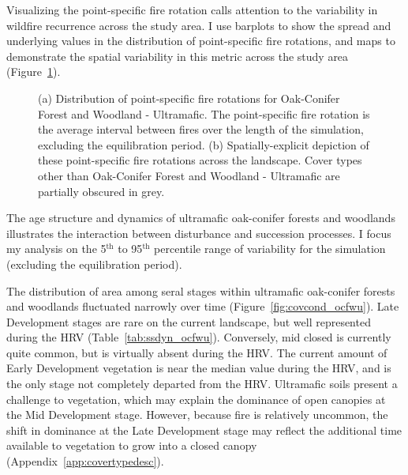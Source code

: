 Visualizing the point-specific fire rotation calls attention to the variability in wildfire recurrence across the study area. I use barplots to show the spread and underlying values in the distribution of point-specific fire rotations, and maps to demonstrate the spatial variability in this metric across the study area (Figure~\ref{fig:preturn_ocfwu}).

\begin{figure}[!htbp]
  \centering
  \caption{(a) Distribution of point-specific fire rotations for Oak-Conifer Forest and Woodland - Ultramafic. The point-specific fire rotation is the average interval between fires over the length of the simulation, excluding the equilibration period. (b) Spatially-explicit depiction of these point-specific fire rotations across the landscape. Cover types other than Oak-Conifer Forest and Woodland - Ultramafic are partially obscured in grey.}
\label{fig:preturn_ocfwu}
\end{figure}

The age structure and dynamics of ultramafic oak-conifer forests and woodlands illustrates the interaction between disturbance and succession processes. I focus my analysis on the 5$^{\text{th}}$ to 95$^{\text{th}}$ percentile range of variability for the simulation (excluding the equilibration period). %

The distribution of area among seral stages within ultramafic oak-conifer forests and woodlands fluctuated narrowly over time (Figure~\ref{fig:covcond_ocfwu}). Late Development stages are rare on the current landscape, but well represented during the HRV (Table~\ref{tab:ssdyn_ocfwu}). Conversely, mid closed is currently quite common, but is virtually absent during the HRV. The current amount of Early Development vegetation is near the median value during the HRV, and is the only stage not completely departed from the HRV. Ultramafic soils present a challenge to vegetation, which may explain the dominance of open canopies at the Mid Development stage. However, because fire is relatively uncommon, the shift in dominance at the Late Development stage may reflect the additional time available to vegetation to grow into a closed canopy (Appendix~\ref{app:covertypedesc}). %

